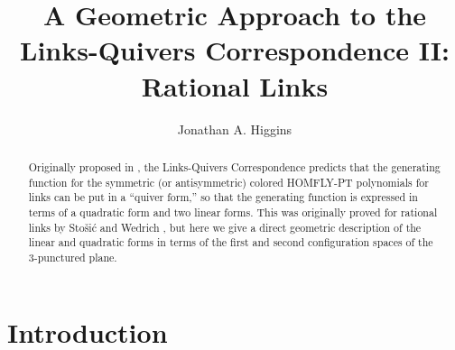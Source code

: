 \documentclass[11pt]{amsart}
\title[Geometric Approach to Links-Quivers Correspondence]{A Geometric Approach to the Links-Quivers Correspondence II: Rational Links}
\author{Jonathan A. Higgins}
\theoremstyle{plain}
\theoremstyle{definition}
\theoremstyle{remark}
\begin{document}
\address{Jonathan Higgins, Department of Mathematics, University of Illinois Urbana-Champaign, 1409 W Green St, Urbana, IL 61801, USA}

\begin{abstract}
   Originally proposed in \cite{KRSS17,K19}, the Links-Quivers Correspondence predicts that the generating function for the symmetric (or antisymmetric) colored HOMFLY-PT polynomials for links can be put in a ``quiver form,'' so that the generating function is expressed in terms of a quadratic form and two linear forms. This was originally proved for rational links by Sto\v si\'c and Wedrich \cite{SW21}, but here we give a direct geometric description of the linear and quadratic forms in terms of the first and second configuration spaces of the 3-punctured plane.
\end{abstract}


\maketitle



\tableofcontents

\section{Introduction}
\label{introsec}

\end{document}
